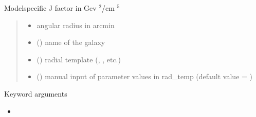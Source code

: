 \documentclass[letterpaper,10pt,english]{sphinxmanual}
\begin{document}

\begin{fulllineitems}
\label{\detokenize{diffsph.profiles:diffsph.profiles.massmodels.J}}
\pysigstartsignatures
{}
\pysigstopsignatures
\sphinxAtStartPar
Model\sphinxhyphen{}specific J factor in Gev \({}^2\)/cm \({}^5\)
\begin{quote}\begin{description}
\begin{itemize}
\item {} 
\sphinxAtStartPar
{} \textendash{} angular radius in arcmin

\item {} 
\sphinxAtStartPar
{} () \textendash{} name of the galaxy

\item {} 
\sphinxAtStartPar
{} () \textendash{} radial template (, , etc.)

\item {} 
\sphinxAtStartPar
{} () \textendash{} manual input of parameter values in rad\_temp (default value = )

\end{itemize}

\end{description}\end{quote}

\sphinxAtStartPar
Keyword arguments
\begin{itemize}
\item {} 
\sphinxAtStartPar
{}


\end{itemize}
\end{fulllineitems}
\end{document}

